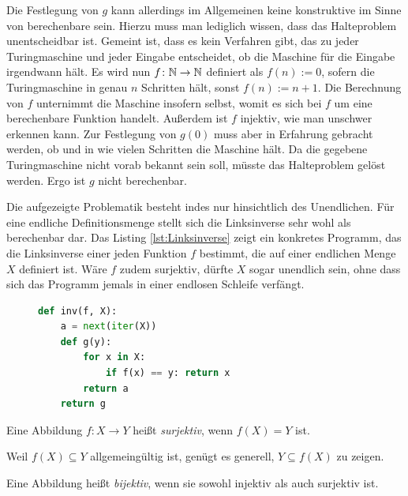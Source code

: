 \noindent
Die Festlegung von $g$ kann allerdings im Allgemeinen keine
konstruktive im Sinne von berechenbare sein. Hierzu muss man lediglich
wissen, dass das Halteproblem unentscheidbar ist.
Gemeint ist, dass es kein Verfahren gibt, das zu jeder
Turingmaschine und jeder Eingabe entscheidet,
ob die Maschine für die Eingabe irgendwann hält. Es wird nun
$f\colon\mathbb N\to\mathbb N$ definiert als $f(n):=0$, sofern die Turingmaschine
in genau $n$ Schritten hält, sonst $f(n):=n+1$. Die Berechnung von
$f$ unternimmt die Maschine insofern selbst, womit es sich bei $f$ um eine
berechenbare Funktion handelt. Außerdem ist $f$ injektiv, wie man
unschwer erkennen kann. Zur Festlegung von $g(0)$ muss aber in
Erfahrung gebracht werden, ob und in wie vielen Schritten die Maschine
hält. Da die gegebene Turingmaschine nicht vorab bekannt sein soll, müsste
das Halteproblem gelöst werden. Ergo ist $g$ nicht
berechenbar. \cite{Siraphob}

Die aufgezeigte Problematik besteht indes nur hinsichtlich des
Unendlichen. Für eine endliche Definitionsmenge stellt sich die Linksinverse
sehr wohl als berechenbar dar. Das Listing \ref{lst:Linksinverse} zeigt ein
konkretes Programm, das die Linksinverse einer jeden Funktion $f$
bestimmt, die auf einer endlichen Menge $X$ definiert ist. Wäre $f$
zudem surjektiv, dürfte $X$ sogar unendlich sein, ohne dass sich
das Programm jemals in einer endlosen Schleife verfängt.

\begin{figure}
\begin{lstlisting}[language=Python,%
label=lst:Linksinverse,%
caption={Berechnung einer Linksinverse}]
def inv(f, X):
    a = next(iter(X))
    def g(y):
        for x in X:
            if f(x) == y: return x
        return a
    return g
\end{lstlisting}
\end{figure}

\begin{Definition}[Surjektion]\label{def:surjektiv}\newlinefirst
Eine Abbildung $f\colon X\to Y$ heißt \emph{surjektiv},
wenn $f(X)=Y$ ist.
\end{Definition}

\noindent
Weil $f(X)\subseteq Y$ allgemeingültig ist, genügt es generell,
$Y\subseteq f(X)$ zu zeigen.

\begin{Definition}[Bijektion]\label{def:bijektiv}\newlinefirst
Eine Abbildung heißt \emph{bijektiv}, wenn sie sowohl
injektiv als auch surjektiv ist.
\end{Definition}

